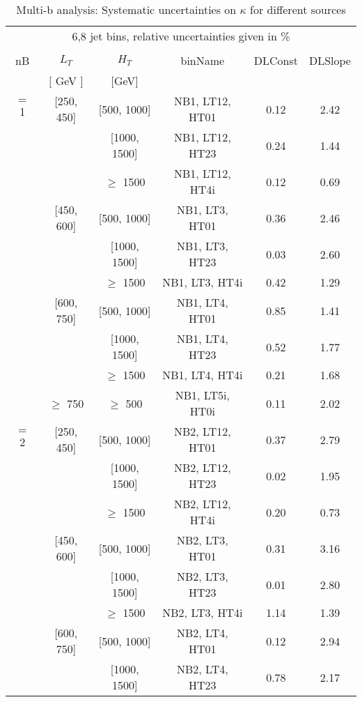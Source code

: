 \begin{table}[ht] 
 \tiny 
\caption{Multi-b analysis: Systematic uncertainties on $\kappa$ for different sources} 
\begin{center} 
\label{tab:sysTable} 
\begin{tabular}{|c | c | c | c | c | c | } 
\hline 
\multicolumn{6}{|c|}{6,8 jet bins, relative uncertainties given in \%} \\ 
\multicolumn{6}{|c|}{} \\ \hline 
nB &  $L_T$ & $H_T$ & binName & DLConst & DLSlope  \\ 
   & $[$ GeV $]$  &  $[$GeV$]$  &  &  &   \\ \hline 
\cline{1-6} $=$ 1 & [250, 450] & [500, 1000]&NB1, LT12, HT01 & 0.12 & 2.42 \\ 
\cline{3-6}  & & [1000, 1500] &NB1, LT12, HT23 & 0.24 & 1.44 \\ 
\cline{3-6}  & & $\geq$ 1500 &NB1, LT12, HT4i & 0.12 & 0.69 \\ 
\cline{2-6}   & [450, 600] & [500, 1000]&NB1, LT3, HT01 & 0.36 & 2.46 \\ 
\cline{3-6}  & & [1000, 1500] &NB1, LT3, HT23 & 0.03 & 2.60 \\ 
\cline{3-6}  & & $\geq$ 1500 &NB1, LT3, HT4i & 0.42 & 1.29 \\ 
\cline{2-6}   & [600, 750] & [500, 1000]&NB1, LT4, HT01 & 0.85 & 1.41 \\ 
\cline{3-6}  & & [1000, 1500] &NB1, LT4, HT23 & 0.52 & 1.77 \\ 
\cline{3-6}  & & $\geq$ 1500 &NB1, LT4, HT4i & 0.21 & 1.68 \\ 
\cline{2-6}   & $\geq$ 750 & $\geq$ 500&NB1, LT5i, HT0i & 0.11 & 2.02 \\ 
\cline{1-6} $=$ 2 & [250, 450] & [500, 1000]&NB2, LT12, HT01 & 0.37 & 2.79 \\ 
\cline{3-6}  & & [1000, 1500] &NB2, LT12, HT23 & 0.02 & 1.95 \\ 
\cline{3-6}  & & $\geq$ 1500 &NB2, LT12, HT4i & 0.20 & 0.73 \\ 
\cline{2-6}   & [450, 600] & [500, 1000]&NB2, LT3, HT01 & 0.31 & 3.16 \\ 
\cline{3-6}  & & [1000, 1500] &NB2, LT3, HT23 & 0.01 & 2.80 \\ 
\cline{3-6}  & & $\geq$ 1500 &NB2, LT3, HT4i & 1.14 & 1.39 \\ 
\cline{2-6}   & [600, 750] & [500, 1000]&NB2, LT4, HT01 & 0.12 & 2.94 \\ 
\cline{3-6}  & & [1000, 1500] &NB2, LT4, HT23 & 0.78 & 2.17 \\ 

\end{tabular}
\end{center}
\end{table}
